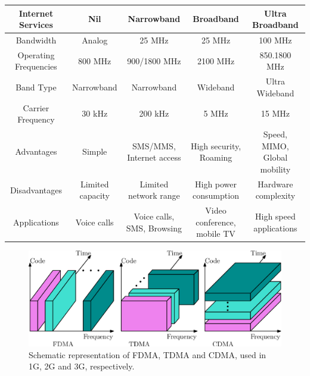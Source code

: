 \begin{table}[ht]
\begin{center}
{\begin{tabular}{|c|c|c|c|c|}
Internet Services       & Nil               & Narrowband                         & Broadband                            & Ultra Broadband                                      \\ \hline
Bandwidth               & Analog            & 25 MHz                             & 25 MHz                               & 100 MHz                                              \\ \hline
Operating Frequencies   & 800 MHz           & 900/1800 MHz                       & 2100 MHz                             & 850.1800 MHz                                         \\ \hline
Band Type               & Narrowband        & Narrowband                         & Wideband                             & Ultra Wideband                                       \\ \hline
Carrier Frequency       & 30 kHz            & 200 kHz                            & 5 MHz                                & 15 MHz                                               \\ \hline
Advantages              & Simple            & SMS/MMS, Internet access           & High security, Roaming & Speed, MIMO, Global mobility                         \\ \hline
Disadvantages           & Limited capacity  & Limited network range              & High power consumption               & Hardware complexity                                  \\ \hline
Applications            & Voice calls       & Voice calls, SMS, Browsing & Video conference, mobile TV     & High speed applications \\ \hline
\end{tabular}}\relax
\end{center}
\end{table}

\setcounter{figure}{0}
\begin{figure}
 \begin{center}
  \includegraphics[scale=0.75]{src/Figures/chap5/MultipleAccess.eps}
  \caption{Schematic representation of FDMA, TDMA and CDMA, used in 1G, 2G and 3G, respectively.} \label{Fig_MA}
 \end{center}
\end{figure}


